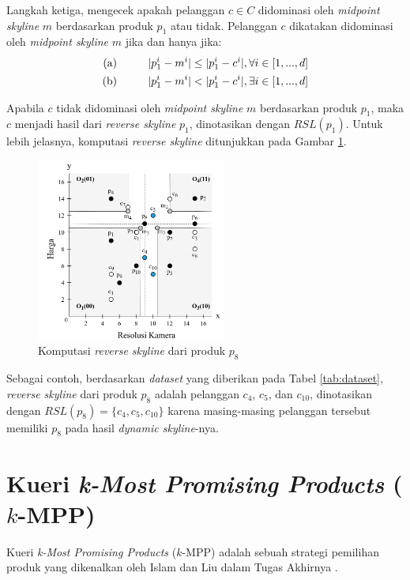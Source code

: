 Langkah ketiga, mengecek apakah pelanggan $c \in C$ didominasi oleh \textit{midpoint skyline} $m$ berdasarkan produk $p_1$ atau tidak. Pelanggan $c$ dikatakan didominasi oleh \textit{midpoint skyline} $m$ jika dan hanya jika:
\begin{equation}\label{eq:mid-skyline}
\begin{split}
\text{(a)} \hspace*{1cm} |p_1^i - m^i| \leq |p_1^i - c^i|, \forall i \in [1, ..., d] \\
\text{(b)} \hspace*{1cm} |p_1^i - m^i| < |p_1^i - c^i|, \exists i \in [1, ..., d]
\end{split}
\end{equation}

Apabila $c$ tidak didominasi oleh \textit{midpoint skyline} $m$ berdasarkan produk $p_1$, maka $c$ menjadi hasil dari \textit{reverse skyline} $p_1$, dinotasikan dengan $RSL(p_1)$. Untuk lebih jelasnya, komputasi \textit{reverse skyline} ditunjukkan pada Gambar \ref{fig:rsl}.

\begin{figure}[h]
	\centering
	\includegraphics[height=6cm]{assets/img/bab2/rsl.png}
	\caption{Komputasi \textit{reverse skyline} dari produk $p_8$}
	\label{fig:rsl}
\end{figure}

Sebagai contoh, berdasarkan \textit{dataset} yang diberikan pada Tabel \ref{tab:dataset}, \textit{reverse skyline} dari produk $p_8$ adalah pelanggan $c_4$, $c_5$, dan $c_{10}$, dinotasikan dengan $RSL(p_8) = \{c_4, c_5, c_{10}\}$ karena masing-masing pelanggan tersebut memiliki $p_8$ pada hasil \textit{dynamic skyline}-nya.

\section{Kueri \textit{k-Most Promising Products} ($k$-MPP)}
\tab Kueri \textit{k-Most Promising Products} ($k$-MPP) adalah sebuah strategi pemilihan produk yang dikenalkan oleh Islam dan Liu dalam Tugas Akhirnya \cite{kmpp}.

